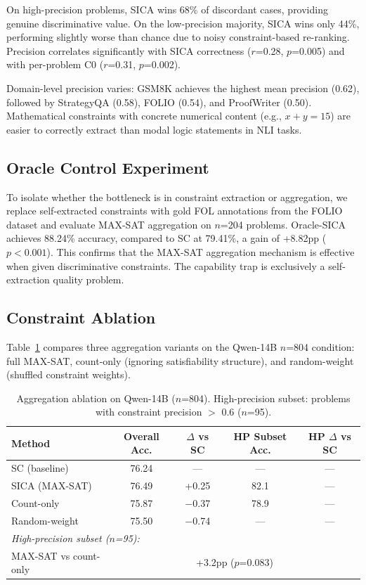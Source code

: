 \documentclass[11pt,a4paper]{article}
\begin{document}
On high-precision problems, SICA wins 68\% of discordant cases, providing genuine discriminative value. On the low-precision majority, SICA wins only 44\%, performing slightly worse than chance due to noisy constraint-based re-ranking. Precision correlates significantly with SICA correctness ($r$=0.28, $p$=0.005) and with per-problem C0 ($r$=0.31, $p$=0.002).

Domain-level precision varies: GSM8K achieves the highest mean precision (0.62), followed by StrategyQA (0.58), FOLIO (0.54), and ProofWriter (0.50). Mathematical constraints with concrete numerical content (e.g., $x + y = 15$) are easier to correctly extract than modal logic statements in NLI tasks.

\subsection{Oracle Control Experiment}

To isolate whether the bottleneck is in constraint extraction or aggregation, we replace self-extracted constraints with gold FOL annotations from the FOLIO dataset and evaluate MAX-SAT aggregation on $n$=204 problems. Oracle-SICA achieves 88.24\% accuracy, compared to SC at 79.41\%, a gain of +8.82pp ($p < 0.001$). This confirms that the MAX-SAT aggregation mechanism is effective when given discriminative constraints. The capability trap is exclusively a self-extraction quality problem.

\subsection{Constraint Ablation}
\label{sec:ablation}

Table~\ref{tab:ablation} compares three aggregation variants on the Qwen-14B $n$=804 condition: full MAX-SAT, count-only (ignoring satisfiability structure), and random-weight (shuffled constraint weights).

\begin{table}[t]
\centering
\caption{Aggregation ablation on Qwen-14B ($n$=804). High-precision subset: problems with constraint precision $>$ 0.6 ($n$=95).}
\label{tab:ablation}
\small
\begin{tabular}{lcccc}
\toprule
\textbf{Method} & \textbf{Overall Acc.} & \textbf{$\Delta$ vs SC} & \textbf{HP Subset Acc.} & \textbf{HP $\Delta$ vs SC} \\
\midrule
SC (baseline) & 76.24 & --- & --- & --- \\
SICA (MAX-SAT) & 76.49 & +0.25 & 82.1 & --- \\
Count-only & 75.87 & $-$0.37 & 78.9 & --- \\
Random-weight & 75.50 & $-$0.74 & --- & --- \\
\midrule
\multicolumn{5}{l}{\textit{High-precision subset ($n$=95):}} \\
MAX-SAT vs count-only & \multicolumn{4}{c}{+3.2pp ($p$=0.083)} \\
\bottomrule
\end{tabular}
\end{table}
\end{document}
